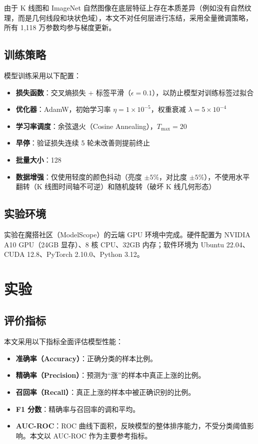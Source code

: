 \documentclass[12pt,a4paper]{ctexart}
\begin{document}
由于 K 线图和 ImageNet 自然图像在底层特征上存在本质差异（例如没有自然纹理，而是几何线段和块状色域），本文不对任何层进行冻结，采用全量微调策略，所有 1,118 万参数均参与梯度更新。

\subsection{训练策略}

模型训练采用以下配置：
\begin{itemize}[noitemsep]
    \item \textbf{损失函数}：交叉熵损失 + 标签平滑（$\epsilon = 0.1$），以防止模型对训练标签过拟合
    \item \textbf{优化器}：AdamW，初始学习率 $\eta = 1 \times 10^{-5}$，权重衰减 $\lambda = 5 \times 10^{-4}$
    \item \textbf{学习率调度}：余弦退火（Cosine Annealing），$T_{\text{max}} = 20$
    \item \textbf{早停}：验证损失连续 5 轮未改善则提前终止
    \item \textbf{批量大小}：128
    \item \textbf{数据增强}：仅使用轻度的颜色抖动（亮度 $\pm 5\%$，对比度 $\pm 5\%$），不使用水平翻转（K 线图时间轴不可逆）和随机旋转（破坏 K 线几何形态）
\end{itemize}

\subsection{实验环境}

实验在魔搭社区（ModelScope）的云端 GPU 环境中完成。硬件配置为 NVIDIA A10 GPU（24GB 显存）、8 核 CPU、32GB 内存；软件环境为 Ubuntu 22.04、CUDA 12.8、PyTorch 2.10.0、Python 3.12。

\section{实验}

\subsection{评价指标}

本文采用以下指标全面评估模型性能：
\begin{itemize}[noitemsep]
    \item \textbf{准确率（Accuracy）}：正确分类的样本比例。
    \item \textbf{精确率（Precision）}：预测为``涨''的样本中真正上涨的比例。
    \item \textbf{召回率（Recall）}：真正上涨的样本中被正确识别的比例。
    \item \textbf{F1 分数}：精确率与召回率的调和平均。
    \item \textbf{AUC-ROC}：ROC 曲线下面积，反映模型的整体排序能力，不受分类阈值影响。本文以 AUC-ROC 作为主要参考指标。
\end{itemize}
\end{document}
